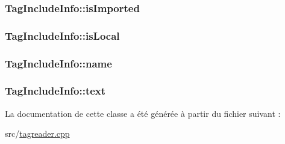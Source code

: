 \subsubsection[{is\+Imported}]{ Tag\+Include\+Info\+::is\+Imported}\label{class_tag_include_info_a9798905f48ab4a543317647199c206d0}
\hypertarget{class_tag_include_info_a4926eb44b0f0e2324b58501d4facb4b5}{}
\subsubsection[{is\+Local}]{ Tag\+Include\+Info\+::is\+Local}\label{class_tag_include_info_a4926eb44b0f0e2324b58501d4facb4b5}
\hypertarget{class_tag_include_info_a60a7cf6f8fe2465630b5fbead1bcf44d}{}
\subsubsection[{name}]{ Tag\+Include\+Info\+::name}\label{class_tag_include_info_a60a7cf6f8fe2465630b5fbead1bcf44d}
\hypertarget{class_tag_include_info_ae282ee1c7897b57c6b6155742097c230}{}
\subsubsection[{text}]{ Tag\+Include\+Info\+::text}\label{class_tag_include_info_ae282ee1c7897b57c6b6155742097c230}


La documentation de cette classe a été générée à partir du fichier suivant \+:\begin{DoxyCompactItemize}
\item 
src/\hyperlink{tagreader_8cpp}{tagreader.\+cpp}\end{DoxyCompactItemize}
